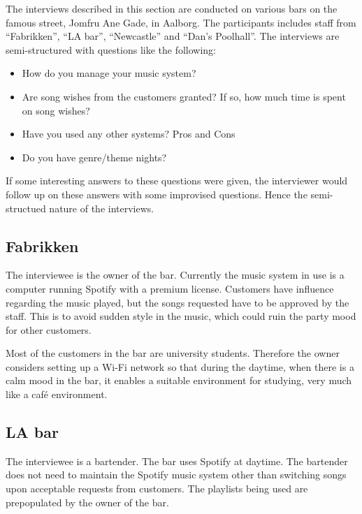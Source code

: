 \label{interviews}
The interviews described in this section are conducted on various bars on the famous street, Jomfru Ane Gade, in Aalborg. The participants includes staff from \enquote{Fabrikken}, \enquote{LA bar}, \enquote{Newcastle} and \enquote{Dan's Poolhall}. The interviews are semi-structured with questions like the following:

\begin{itemize}
  \item How do you manage your music system?
  \item Are song wishes from the customers granted? If so, how much time is spent on song wishes?
  \item Have you used any other systems? Pros and Cons
  \item Do you have genre/theme nights?
\end{itemize}

If some interesting answers to these questions were given, the interviewer would follow up on these answers with some improvised questions. Hence the semi-structued nature of the interviews.

\subsection{Fabrikken}
\label{sub:fabrikken}

The interviewee is the owner of the bar. Currently the music system in use is a computer running Spotify with a premium license. Customers have influence regarding the music played, but the songs requested have to be approved by the staff. This is to avoid sudden style in the music, which could ruin the party mood for other customers.

Most of the customers in the bar are university students. Therefore the owner considers setting up a Wi-Fi network so that during the daytime, when there is a calm mood in the bar, it enables a suitable environment for studying, very much like a café environment.

\subsection{LA bar}
\label{sub:la_bar}

The interviewee is a bartender. The bar uses Spotify at daytime. The bartender does not need to maintain the Spotify music system other than switching songs upon acceptable requests from customers. The playlists being used are prepopulated by the owner of the bar.

